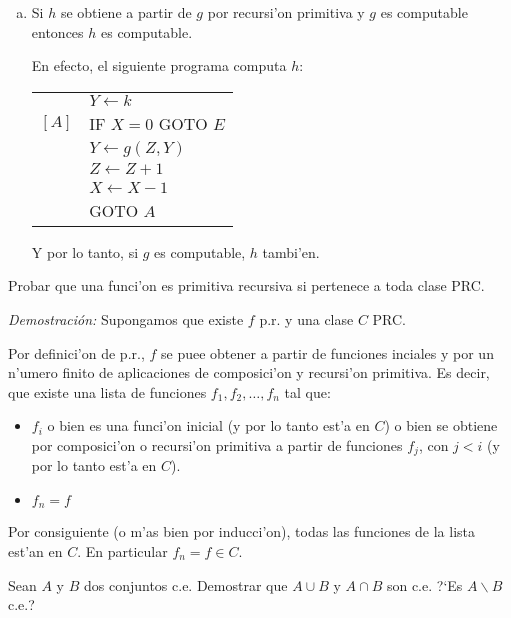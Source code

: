\begin{questions}
\begin{solution}
\begin{enumerate}[(a)]
  \item Si $h$ se obtiene a partir de $g$ por recursi'on primitiva y $g$ es computable entonces $h$ es computable. 
  
  En efecto, el siguiente programa computa $h$: 
  
  \vspace{0.5cm}
  \begin{tabular}{rl}
	  & $Y \leftarrow k$ \\ 
    $[A]$ & IF $X=0$ GOTO $E$ \\
	  & $Y \leftarrow g(Z,Y)$ \\
	  & $Z \leftarrow Z+1$ \\
	  & $X \leftarrow X-1$ \\
	  & GOTO $A$
  \end{tabular}
  \vspace{0.5cm}
  
  Y por lo tanto, si $g$ es computable, $h$ tambi'en. 
  \end{enumerate}
\end{solution}

\question Probar que una funci'on es primitiva recursiva si pertenece a toda clase PRC.
\begin{solution}
  
  {\it Demostraci\'on: } Supongamos que existe $f$ p.r. y una clase $C$ PRC. 

  Por definici'on de p.r., $f$ se puee obtener a partir de funciones inciales y por un n'umero finito de aplicaciones de composici'on y recursi'on primitiva. Es decir, que existe una lista de funciones $f_1, f_2, \dots, f_n$ tal que: 

  \begin{itemize}
  \item $f_i$ o bien es una funci'on inicial (y por lo tanto est'a en $C$) o bien se obtiene por composici'on o recursi'on primitiva a partir de funciones $f_j$, con $j < i$ (y por lo tanto est'a en $C$). 
  \item $f_n = f$
  \end{itemize}

  Por consiguiente (o m'as bien por inducci'on), todas las funciones de la lista est'an en $C$. En particular $f_n = f \in C$. 
\end{solution}

\question Sean $A$ y $B$ dos conjuntos c.e. Demostrar que $A \cup B$ y $A \cap B$ son c.e. ?`Es $A\backslash B$ c.e.?
\begin{solution}
  

\end{solution}
\end{questions}
